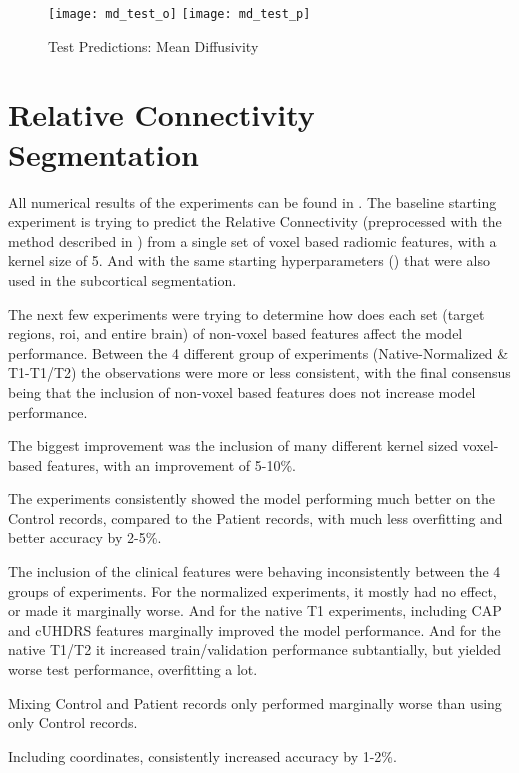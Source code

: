 \begin{figure}[H]
\centering
\texttt{[image: md\_test\_o]}
\texttt{[image: md\_test\_p]}
\caption{Test Predictions: Mean Diffusivity}
\label{fig:pred-tes-md}
\end{figure}

\section{Relative Connectivity Segmentation}

All numerical results of the experiments can be found in  .
The baseline starting experiment is trying to predict the Relative Connectivity (preprocessed with the method described in ) from a single set of voxel based radiomic features, with a kernel size of 5. And with the same starting hyperparameters () that were also used in the subcortical segmentation.\par
The next few experiments were trying to determine how does each set (target regions, roi, and entire brain) of non-voxel based features affect the model performance. Between the 4 different group of experiments (Native-Normalized \& T1-T1/T2) the observations were more or less consistent, with the final consensus being that the inclusion of non-voxel based features does not increase model performance.\par
The biggest improvement was the inclusion of many different kernel sized voxel-based features, with an improvement of 5-10\%.\par
The experiments consistently showed the model performing much better on the Control records, compared to the Patient records, with much less overfitting and better accuracy by 2-5\%.\par
The inclusion of the clinical features were behaving inconsistently between the 4 groups of experiments. For the normalized experiments, it mostly had no effect, or made it marginally worse. And for the native T1 experiments, including \ac{CAP} and \ac{cUHDRS} features marginally improved the model performance. And for the native T1/T2 it increased train/validation performance subtantially, but yielded worse test performance, overfitting a lot.\par
Mixing Control and Patient records only performed marginally worse than using only Control records.\par
Including coordinates, consistently increased accuracy by 1-2\%.\par
